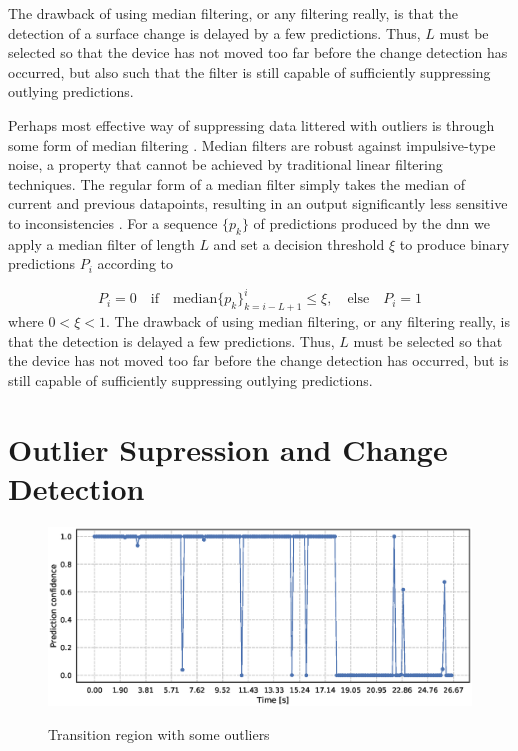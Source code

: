 The drawback of using median filtering, or any filtering really, is that the detection of a surface change is delayed by a few predictions. Thus, $L$ must be selected so that the device has not moved too far before the change detection has occurred, but also such that the filter is still capable of sufficiently  suppressing outlying predictions. 

\iffalse
Perhaps most effective way of suppressing data littered with outliers is through some form of median filtering \citep{yin_yang_gabbouj_neuvo_1996}. Median filters are robust against impulsive-type noise, a property that cannot be achieved by traditional linear filtering techniques. The regular form of a median filter simply takes the median of current and previous datapoints, resulting in an output significantly less sensitive to inconsistencies \citep{pearson_2002}. For a sequence $\{p_k\}$ of predictions produced by the \gls{dnn} we apply a median filter of length $L$ and set a decision threshold $\xi$ to produce binary predictions $P_i$ according to
\citep{yin_yang_gabbouj_neuvo_1996}

\begin{equation}
	P_i=0 \quad\text{if}\quad\text{median}\{p_k\}_{k=i-L+1}^i\leq\xi, 
	\quad \text{else} \quad P_i = 1
\end{equation}
where $0<\xi<1$. The drawback of using median filtering, or any filtering really, is that the detection is delayed a few predictions. Thus, $L$ must be selected so that the device has not moved too far before the change detection has occurred, but is still capable of sufficiently  suppressing outlying predictions. 


\section{Outlier Supression and Change Detection}


\begin{figure}
	\includegraphics[scale=0.5]{figs_temp/detect_nothing}
	\label{fig:detect_no}
	\caption{Transition region with some outliers}
\end{figure}

